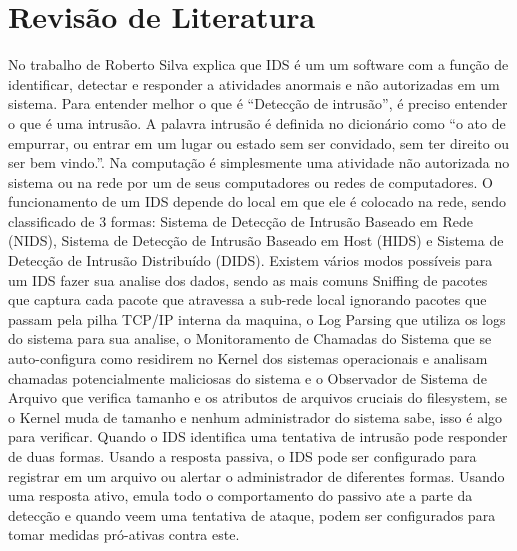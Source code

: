 \chapter[Revisão de Literatura]{Revisão de Literatura}
No trabalho de Roberto Silva \cite{RobertoSilva} explica que IDS é um um software com a função de identificar, detectar e responder a atividades anormais e não autorizadas em um sistema. Para entender melhor o que é “Detecção de intrusão”, é preciso entender o que é uma intrusão. A palavra intrusão é definida no dicionário como “o ato de empurrar, ou entrar em um lugar ou estado sem ser convidado, sem ter direito ou ser bem vindo.”. Na computação é simplesmente uma atividade não autorizada no sistema ou na rede por um de seus computadores ou redes de computadores. O funcionamento de um IDS depende do local em que ele é colocado na rede, sendo classificado de 3 formas: Sistema de Detecção de Intrusão Baseado em Rede (NIDS), Sistema de Detecção de Intrusão Baseado em Host (HIDS) e Sistema de Detecção de Intrusão Distribuído (DIDS). 
Existem vários modos possíveis para um IDS fazer sua analise dos dados, sendo as mais comuns Sniffing de pacotes que captura cada pacote que atravessa a sub-rede local ignorando pacotes que passam pela pilha TCP/IP interna da maquina, o Log Parsing que utiliza os logs do sistema para sua analise, o Monitoramento de Chamadas do Sistema que se auto-configura como residirem no Kernel dos sistemas operacionais e analisam chamadas potencialmente maliciosas do sistema e o Observador de Sistema de Arquivo que verifica tamanho e os atributos de arquivos cruciais do filesystem, se o Kernel muda de tamanho e nenhum administrador do sistema sabe, isso é algo para verificar. 
Quando o IDS identifica uma tentativa de intrusão pode responder de duas formas. Usando a resposta passiva, o IDS pode ser configurado para registrar em um arquivo ou alertar o administrador de diferentes formas. Usando uma resposta ativo, emula todo o comportamento do passivo ate a parte da detecção e quando veem uma tentativa de ataque, podem ser configurados para tomar medidas pró-ativas contra este.

